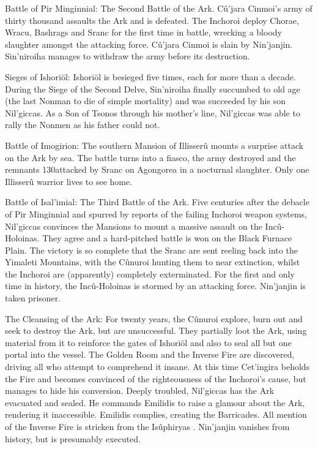\documentclass[]{book}
\begin{document}
Battle of Pir Minginnial: The Second Battle of the Ark. Cû'jara Cinmoi's army of thirty
thousand assaults the Ark and is defeated. The Inchoroi deploy Chorae, Wracu,
Bashrags and Sranc for the first time in battle, wrecking a bloody slaughter amongst the
attacking force. Cû'jara Cinmoi is slain by Nin'janjin. Sin'niroiha manages to withdraw
the army before its destruction.

Sieges of Ishoriöl: Ishoriöl is besieged five times, each for more than a decade. During
the Siege of the Second Delve, Sin'niroiha finally succumbed to old age (the last
Nonman to die of simple mortality) and was succeeded by his son Nil'giccas. As a Son
of Tsonos through his mother's line, Nil'giccas was able to rally the Nonmen as his
father could not.

Battle of Imogirion: The southern Mansion of Illisserû mounts a surprise attack on the
Ark by sea. The battle turns into a fiasco, the army destroyed and the remnants
130attacked by Sranc on Agongorea in a nocturnal slaughter. Only one Illisserû warrior
lives to see home.

Battle of Isal'imial: The Third Battle of the Ark. Five centuries after the debacle of Pir
Minginnial and spurred by reports of the failing Inchoroi weapon systems, Nil'giccas
convinces the Mansions to mount a massive assault on the Incû-Holoinas. They agree
and a hard-pitched battle is won on the Black Furnace Plain. The victory is so complete
that the Sranc are sent reeling back into the Yimaleti Mountains, with the Cûnuroi
hunting them to near extinction, whilst the Inchoroi are (apparently) completely
exterminated. For the first and only time in history, the Incû-Holoinas is stormed by an
attacking force. Nin'janjin is taken prisoner.

The Cleansing of the Ark: For twenty years, the Cûnuroi explore, burn out and seek to
destroy the Ark, but are unsuccessful. They partially loot the Ark, using material from it
to reinforce the gates of Ishoriöl and also to seal all but one portal into the vessel. The
Golden Room and the Inverse Fire are discovered, driving all who attempt to
comprehend it insane. At this time Cet'ingira beholds the Fire and becomes convinced
of the righteousness of the Inchoroi's cause, but manages to hide his conversion.
Deeply troubled, Nil'giccas has the Ark evacuated and sealed. He commands Emilidis
to raise a glamour about the Ark, rendering it inaccessible. Emilidis complies, creating
the Barricades. All mention of the Inverse Fire is stricken from the Isûphiryas .
Nin'janjin vanishes from history, but is presumably executed.
\end{document}
